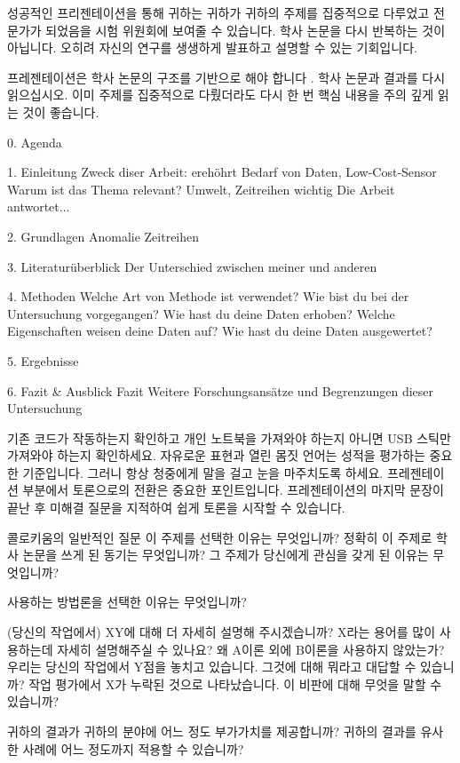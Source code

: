 성공적인 프리젠테이션을 통해 귀하는 귀하가 귀하의 주제를 집중적으로 다루었고 전문가가 되었음을 시험 위원회에 보여줄 수 있습니다.
학사 논문을 다시 반복하는 것이 아닙니다. 오히려 자신의 연구를 생생하게 발표하고 설명할 수 있는 기회입니다.

프레젠테이션은 학사 논문의 구조를 기반으로 해야 합니다 .
학사 논문과 결과를 다시 읽으십시오. 이미 주제를 집중적으로 다뤘더라도 다시 한 번 핵심 내용을 주의 깊게 읽는 것이 좋습니다.


0. Agenda

1. Einleitung
    Zweck diser Arbeit: erehöhrt Bedarf von Daten, Low-Cost-Sensor
    Warum ist das Thema relevant? Umwelt, Zeitreihen wichtig
    Die Arbeit antwortet...

2. Grundlagen
    Anomalie
    Zeitreihen

3. Literaturüberblick
    Der Unterschied zwischen meiner und anderen

4. Methoden
    Welche Art von Methode ist verwendet?
    Wie bist du bei der Untersuchung vorgegangen?
    Wie hast du deine Daten erhoben?
    Welche Eigenschaften weisen deine Daten auf?
    Wie hast du deine Daten ausgewertet?

5. Ergebnisse

6. Fazit & Ausblick
    Fazit
    Weitere Forschungsansätze und Begrenzungen dieser Untersuchung








기존 코드가 작동하는지 확인하고 개인 노트북을 가져와야 하는지 아니면 USB 스틱만 가져와야 하는지 확인하세요.
자유로운 표현과 열린 몸짓 언어는 성적을 평가하는 중요한 기준입니다. 그러니 항상 청중에게 말을 걸고 눈을 마주치도록 하세요.
프레젠테이션 부분에서 토론으로의 전환은 중요한 포인트입니다. 프레젠테이션의 마지막 문장이 끝난 후 미해결 질문을 지적하여 쉽게 토론을 시작할 수 있습니다.




콜로키움의 일반적인 질문
    이 주제를 선택한 이유는 무엇입니까?
    정확히 이 주제로 학사 논문을 쓰게 된 동기는 무엇입니까?
    그 주제가 당신에게 관심을 갖게 된 이유는 무엇입니까?

    사용하는 방법론을 선택한 이유는 무엇입니까?

    (당신의 작업에서) XY에 대해 더 자세히 설명해 주시겠습니까?
    X라는 용어를 많이 사용하는데 자세히 설명해주실 수 있나요?
    왜 A이론 외에 B이론을 사용하지 않았는가?
    우리는 당신의 작업에서 Y점을 놓치고 있습니다. 그것에 대해 뭐라고 대답할 수 있습니까?
    작업 평가에서 X가 누락된 것으로 나타났습니다. 이 비판에 대해 무엇을 말할 수 있습니까?

    귀하의 결과가 귀하의 분야에 어느 정도 부가가치를 제공합니까?
    귀하의 결과를 유사한 사례에 어느 정도까지 적용할 수 있습니까?